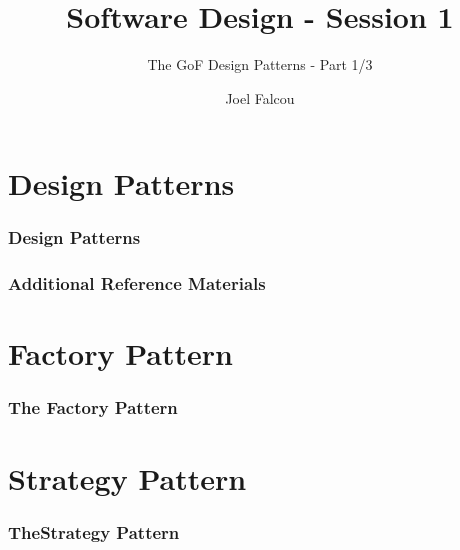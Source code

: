 \documentclass{beamer}
\title{Software Design - Session 1}
\subtitle{The GoF Design Patterns - Part 1/3}
\author{Joel Falcou}
\institute{Laboratoire de Recherche en Informatique - Université Paris Sud 11}
\date{}
\begin{document}
\section{Design Patterns}
\frame
{
  \frametitle{Design Patterns}
}

\frame{}

\frame
{
  \frametitle{Additional Reference Materials}
}

\section{Factory Pattern}
\frame
{
  \frametitle{The Factory Pattern}
}

\frame
{

}

\section{Strategy Pattern}
\frame
{
  \frametitle{TheStrategy Pattern}
}

\frame{}
\end{document}
